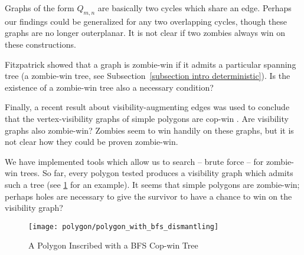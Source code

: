 Graphs of the form $Q_{m,n}$ are basically two cycles which share an edge. Perhaps our findings could be generalized for any two overlapping cycles, though these graphs are no longer outerplanar. It is not clear if two zombies always win on these constructions.

Fitzpatrick showed that a graph is zombie-win if it admits a particular spanning tree (a zombie-win tree, see Subsection~\ref{subsection intro deterministic}). Is the existence of a zombie-win tree also a necessary condition?

Finally, a recent result about visibility-augmenting edges \cite{aichholzer2011convexifying} was used to conclude that the vertex-visibility graphs of simple polygons are cop-win \cite{lubiw2017visibility}. Are visibility graphs also zombie-win? Zombies seem to win handily on these graphs, but it is not clear how they could be proven zombie-win.

We have implemented tools which allow us to search -- brute force -- for zombie-win trees. So far, every polygon tested produces a visibility graph which admits such a tree (see \ref{fig:polygon_with_bfs_dismantling} for an example).
It seems that simple polygons are zombie-win; perhaps holes are necessary to give the survivor to have a chance to win on the visibility graph?

\begin{figure}
  \centering
  \texttt{[image: polygon/polygon\_with\_bfs\_dismantling]}
  \caption{A Polygon Inscribed with a BFS Cop-win Tree \label{fig:polygon_with_bfs_dismantling}}
\end{figure}
